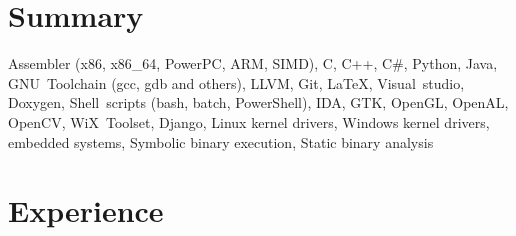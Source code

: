 \documentclass[11pt, a4paper]{moderncv}
\begin{document}
\makecvtitle



\section{Summary}


{
  Assembler (x86, x86\_64, PowerPC, ARM, SIMD), C, C++, C\#, Python, Java,
  GNU~Toolchain (gcc, gdb and others), LLVM, Git, LaTeX, Visual~studio, Doxygen, Shell~scripts (bash, batch, PowerShell), IDA,
  GTK, OpenGL, OpenAL, OpenCV, WiX~Toolset, Django,
  Linux kernel drivers, Windows kernel drivers, embedded systems,
  Symbolic binary execution, Static binary analysis
}




\section{Experience}
\end{document}

